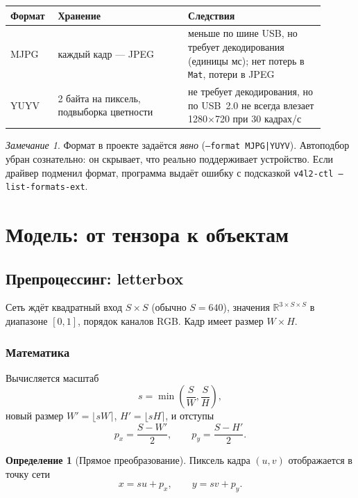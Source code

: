 \documentclass[11pt,a4paper]{article}
\theoremstyle{definition}
\newtheorem{definition}{Определение}[section]
\theoremstyle{remark}
\newtheorem*{remark}{Замечание}
\begin{document}
\begin{center}
\begin{tabular}{p{0.12\linewidth}p{0.38\linewidth}p{0.40\linewidth}}
\toprule
Формат & Хранение & Следствия \\
\midrule
MJPG & каждый кадр --- JPEG & меньше по шине USB, но требует декодирования
(единицы мс); нет потерь в \texttt{Mat}, потери в JPEG \\
YUYV & 2 байта на пиксель, подвыборка цветности & не требует декодирования,
но по USB~2.0 не всегда влезает 1280$\times$720 при 30 кадрах/с \\
\bottomrule
\end{tabular}
\end{center}

\begin{remark}
Формат в проекте задаётся \emph{явно} (\texttt{--format MJPG|YUYV}).
Автоподбор убран сознательно: он скрывает, что реально поддерживает устройство.
Если драйвер подменил формат, программа выдаёт ошибку с подсказкой
\texttt{v4l2-ctl --list-formats-ext}.
\end{remark}

\section{Модель: от тензора к объектам}

\subsection{Препроцессинг: letterbox}

Сеть ждёт квадратный вход $S \times S$ (обычно $S = 640$), значения
$\mathbb{R}^{3 \times S \times S}$ в диапазоне $[0,1]$, порядок каналов RGB.
Кадр имеет размер $W \times H$.

\subsubsection{Математика}

Вычисляется масштаб
\[
  s = \min\left(\frac{S}{W}, \frac{S}{H}\right),
\]
новый размер $W' = \lfloor sW \rceil$, $H' = \lfloor sH \rceil$, и отступы
\[
  p_x = \frac{S - W'}{2}, \qquad p_y = \frac{S - H'}{2}.
\]

\begin{definition}[Прямое преобразование]
Пиксель кадра $(u,v)$ отображается в точку сети
\[
  x = s u + p_x, \qquad y = s v + p_y.
\]
\end{definition}
\end{document}
